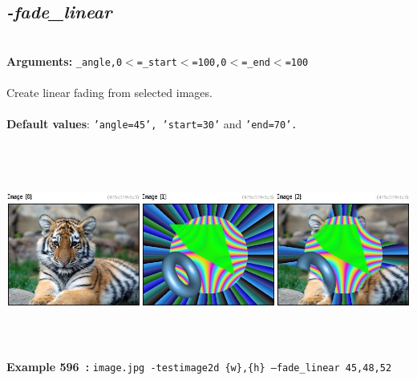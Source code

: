 \documentclass[a4paper,11pt,twoside]{book}
\begin{document}
\subsection{\emph{-fade\_linear} }\vspace*{-0.5em}
~\\\textbf{Arguments: } 
{\small \texttt{\_angle,0$<$=\_start$<$=100,0$<$=\_end$<$=100}}\\~\\
Create linear fading from selected images.
~\\~\\\textbf{Default values}: {\small \texttt{'angle=45', 'start=30'} and \texttt{'end=70'.}}
\begin{center}\includegraphics[keepaspectratio=true,height=7cm,width=\textwidth]{img/gmic_def596.jpg}\\
{\footnotesize \textbf{Example 596~:} \texttt{image.jpg -testimage2d \{w\},\{h\} --fade\_linear 45,48,52}}
\end{center}
\end{document}
